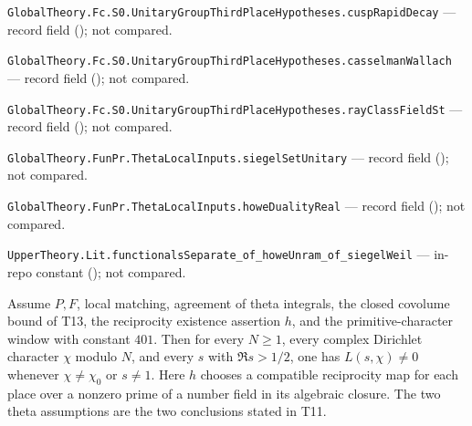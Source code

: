 \noindent\nolinkurl{GlobalTheory.Fc.S0.UnitaryGroupThirdPlaceHypotheses.cuspRapidDecay} --- record field (); not compared.\par
\noindent\nolinkurl{GlobalTheory.Fc.S0.UnitaryGroupThirdPlaceHypotheses.casselmanWallach} --- record field (); not compared.\par
\noindent\nolinkurl{GlobalTheory.Fc.S0.UnitaryGroupThirdPlaceHypotheses.rayClassFieldSt} --- record field (); not compared.\par
\noindent\nolinkurl{GlobalTheory.FunPr.ThetaLocalInputs.siegelSetUnitary} --- record field (); not compared.\par
\noindent\nolinkurl{GlobalTheory.FunPr.ThetaLocalInputs.howeDualityReal} --- record field (); not compared.\par
\noindent\nolinkurl{UpperTheory.Lit.functionalsSeparate_of_howeUnram_of_siegelWeil} --- in-repo constant (); not compared.\par

\begin{formalstatement}\label{sub:T01}

Assume $P,F$, local matching, agreement of theta integrals, the closed
covolume bound of T13, the reciprocity existence assertion $h$, and the
primitive-character window with constant $401$. Then for every $N\ge1$,
every complex Dirichlet character $\chi$ modulo $N$, and every $s$ with
$\Re s>1/2$, one has $L(s,\chi)\ne0$ whenever $\chi\ne\chi_0$ or $s\ne1$.
Here $h$ chooses a compatible reciprocity map for each place over a nonzero
prime of a number field in its algebraic closure. The two theta assumptions
are the two conclusions stated in T11.

\end{formalstatement}
